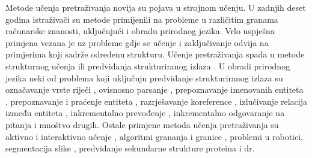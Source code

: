 Metode učenja pretraživanja  novija su
pojava u strojnom učenju. U zadnjih deset godina istraživači su metode
primijenili na probleme u različitim granama računarske znanosti, uključujući i
obradu prirodnog jezika. Vrlo uspješna primjena vezana je uz probleme gdje se
učenje i zaključivanje odvija na primjerima koji sadrže određenu strukturu.
Učenje pretraživanja spada u metode strukturnog učenja  ili predviđanja strukturiranog izlaza . U obradi prirodnog jezika neki od problema koji uključuju
predviđanje strukturiranog izlaza su označavanje vrste riječi
, ovisnosno parsanje ,
prepoznavanje imenovanih entiteta , prepoznavanje
i praćenje entiteta , razrješavanje
koreference , izlučivanje relacija između entiteta
, inkrementalno prevođenje , inkrementalno odgovaranje na pitanja  i mnoštvo drugih. Ostale primjene metoda učenja pretraživanja su
aktivno i interaktivno učenje , algoritmi
grananja i granice , problemi u robotici, segmentacija
slike , predviđanje sekundarne strukture proteina
 i dr.

